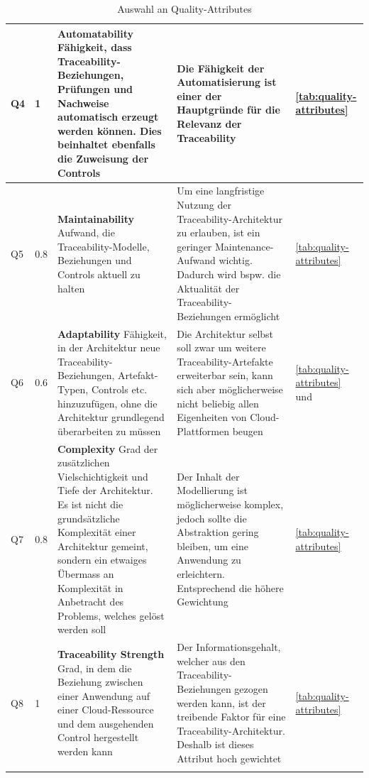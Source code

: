 \begin{longtable}{|
  L{1cm}|
  L{1cm}|
  p{\dimexpr(\textwidth-5cm-10\arrayrulewidth)/2\relax}|
  p{\dimexpr(\textwidth-5cm-10\arrayrulewidth)/2\relax}|
  L{3cm}|
}
    Q4 & 1 & \textbf{Automatability} \hypertarget{quality-q4}{} Fähigkeit, dass Traceability-Beziehungen, Prüfungen und Nachweise automatisch erzeugt werden können. Dies beinhaltet ebenfalls die Zuweisung der Controls &
    Die Fähigkeit der Automatisierung ist einer der Hauptgründe für die Relevanz der Traceability & \autoref{tab:quality-attributes}
    \\
    \hline

    Q5 & 0.8 & \textbf{Maintainability} \hypertarget{quality-q5}{} Aufwand, die Traceability-Modelle, Beziehungen und Controls aktuell zu halten &
    Um eine langfristige Nutzung der Traceability-Architektur zu erlauben, ist ein geringer Maintenance-Aufwand wichtig. Dadurch wird bspw. die Aktualität der Traceability-Beziehungen ermöglicht & \autoref{tab:quality-attributes}
    \\
    \hline

    Q6 & 0.6 & \textbf{Adaptability} \hypertarget{quality-q6}{} Fähigkeit, in der Architektur neue Traceability-Beziehungen, Artefakt-Typen, Controls etc. hinzuzufügen, ohne die Architektur grundlegend überarbeiten zu müssen &
    Die Architektur selbst soll zwar um weitere Traceability-Artefakte erweiterbar sein, kann sich aber möglicherweise nicht beliebig allen Eigenheiten von Cloud-Plattformen beugen & \autoref{tab:quality-attributes} und \cite{bhargav_sai_pillati_leading_2025}
    \\
    \hline

    Q7 & 0.8 & \textbf{Complexity} \hypertarget{quality-q7}{} Grad der zusätzlichen Vielschichtigkeit und Tiefe der Architektur. Es ist nicht die grundsätzliche Komplexität einer Architektur gemeint, sondern ein etwaiges Übermass an Komplexität in Anbetracht des Problems, welches gelöst werden soll &
    Der Inhalt der Modellierung ist möglicherweise komplex, jedoch sollte die Abstraktion gering bleiben, um eine Anwendung zu erleichtern. Entsprechend die höhere Gewichtung & \autoref{tab:quality-attributes}
    \\
    \hline

    Q8 & 1 & \textbf{Traceability Strength} \hypertarget{quality-q8}{} Grad, in dem die Beziehung zwischen einer Anwendung auf einer Cloud-Ressource und dem ausgehenden Control hergestellt werden kann &
    Der Informationsgehalt, welcher aus den Traceability-Beziehungen gezogen werden kann, ist der treibende Faktor für eine Traceability-Architektur. Deshalb ist dieses Attribut hoch gewichtet & \autoref{tab:quality-attributes}
    \\
    \hline

    \caption{Auswahl an Quality-Attributes}
    \label{tab:selection-quality-attributes}
\end{longtable}

